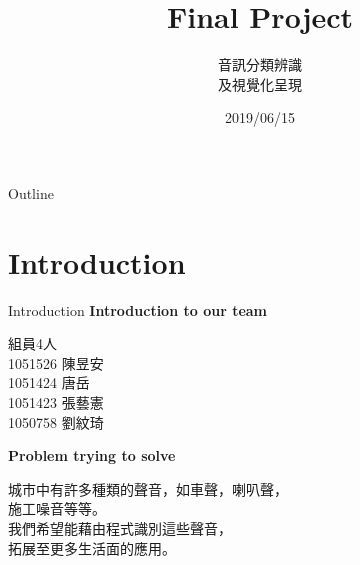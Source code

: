 \documentclass{beamer}
\title{Final Project}
\subtitle
{
  音訊分類辨識\\
  及視覺化呈現
}
\date{2019/06/15}
\begin{document}
\begin{CJK}{UTF8}{bsmi}
\begin{frame}
  \titlepage
\end{frame}

\begin{frame}{Outline}
  \tableofcontents
\end{frame}

\section{Introduction}

\begin{frame}{Introduction}
\textbf{Introduction to our team }
 \vspace{0.5cm}
\begin{description}

\item 組員4人\\
1051526 陳昱安\\
1051424 唐岳\\
1051423 張藝憲\\
1050758 劉紋琦\\
\vspace{0.5cm}
\end{description}
\textbf{Problem trying to solve }
\begin{description}
 \vspace{0.5cm}
\item 城市中有許多種類的聲音，如車聲，喇叭聲， \\
施工噪音等等。\\
我們希望能藉由程式識別這些聲音，\\
拓展至更多生活面的應用。
\end{description}
\end{frame}


\end{CJK}
\end{document}
